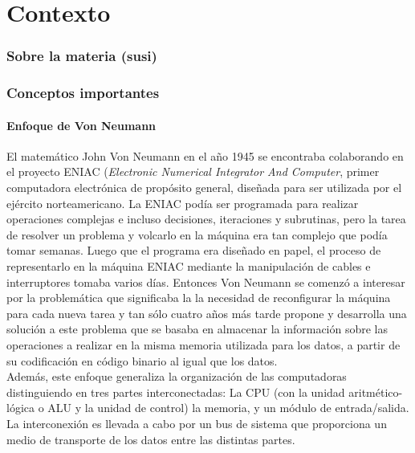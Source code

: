 \part{Contexto}
\section{Sobre la materia \orga (susi)}

\section{Conceptos importantes}

\subsection{Enfoque de Von Neumann}

El matemático John Von Neumann en el año 1945 se encontraba colaborando en el proyecto ENIAC (\textit{Electronic Numerical Integrator And Computer}, primer computadora electrónica de propósito general, diseñada para ser utilizada por el ejército norteamericano. La ENIAC podía ser programada para realizar operaciones complejas e incluso decisiones, iteraciones y subrutinas, pero la tarea de resolver un problema y volcarlo en la máquina era tan complejo que podía tomar semanas. Luego que el programa era diseñado en papel, el proceso de representarlo en la máquina ENIAC mediante la manipulación de cables e interruptores tomaba varios días. Entonces Von Neumann se comenzó a interesar por la problemática que significaba la la necesidad de reconfigurar la máquina para cada nueva tarea y tan sólo cuatro años más tarde propone y desarrolla una solución a este problema que se basaba en almacenar la información sobre las operaciones a realizar en la misma memoria utilizada para los datos, a partir de su codificación en código binario al igual que los datos.\\

Además, este enfoque generaliza la organización de las computadoras distinguiendo en tres partes interconectadas: La CPU (con la unidad aritmético-lógica o ALU y la unidad de control) la memoria, y un módulo de entrada/salida. La interconexión es llevada a cabo por un bus de sistema que proporciona un medio de transporte de los datos entre las distintas partes. \\

